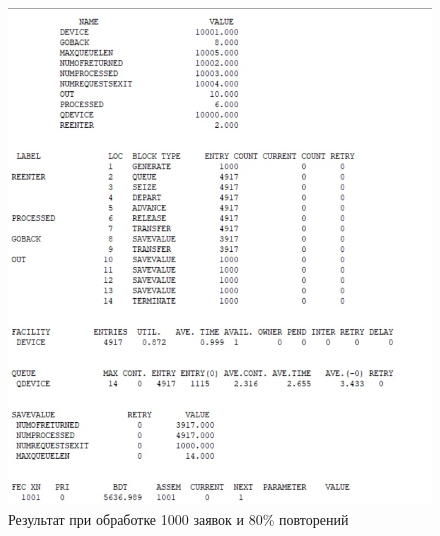 \begin{figure}[H]
	\centering
	\includegraphics[width=\textwidth]{assets/80.jpg}
	\caption{Результат при обработке 1000 заявок и 80\% повторений}
	\label{fig:r80}
\end{figure}